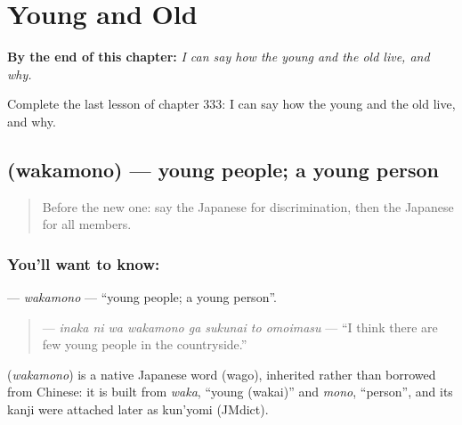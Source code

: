 
\chapter{Young and Old}
\label{ch:ja-young-and-old}

\begin{chapteropening}
\textbf{By the end of this chapter:} \emph{I can say how the young and the old live, and why.}

Complete the last lesson of chapter 333: I can say how the young and the old live, and why.
\end{chapteropening}

\section[\texorpdfstring{\ja{わかもの} (wakamono)}{わかもの (wakamono)}]{ (wakamono) — young people; a young person}

\label{lesson:JA-C333-wakamono}



\begin{quote}
Before the new one: say the Japanese for discrimination, then the Japanese for all members.
\end{quote}

\subsection*{You'll want to know: }
\textbf{} — \emph{wakamono} — \textquotedblleft{}young people; a young person\textquotedblright{}.

\begin{quote}
\textbf{   } — \emph{inaka ni wa wakamono ga sukunai to omoimasu} — \textquotedblleft{}I think there are few young people in the countryside.\textquotedblright{}
\end{quote}

\begin{cousinweb}
\textbf{} (\emph{wakamono}) is a native Japanese word (wago), inherited rather than borrowed from Chinese: it is built from \emph{waka}, \textquotedblleft{}young (wakai)\textquotedblright{} and \emph{mono}, \textquotedblleft{}person\textquotedblright{}, and its kanji were attached later as kun'yomi (JMdict).
\end{cousinweb}

